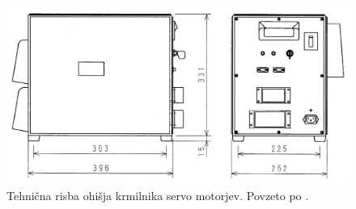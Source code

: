 \begin{figure}
	\centering
	\includegraphics[width=\textwidth]{./Slike/pa10-servocontroller.png}
	\caption{Tehni\v{c}na risba ohi\v{s}ja krmilnika servo motorjev. Povzeto po \cite{pa10-manual}.}
	\label{fig:pa10-servo}
\end{figure}
